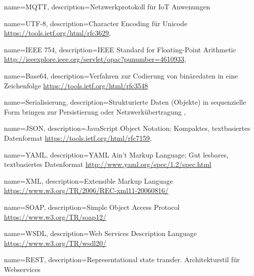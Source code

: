






{
    name=MQTT,
    description={Netzwerkprotokoll für IoT Anwenungen}
}


{
    name=UTF-8,
    description={Character Encoding für Unicode \url{https://tools.ietf.org/html/rfc3629}}, 
}

{
    name=IEEE 754,
    description={IEEE Standard for Floating-Point Arithmetic   \url{http://ieeexplore.ieee.org/servlet/opac?punumber=4610933}}, 
}


{
    name=Base64,
    description={Verfahren zur Codierung von binäredaten in eine Zeichenfolge
     \url{https://tools.ietf.org/html/rfc3548}}
}

{
    name=Serialisierung,
    description={Strukturierte Daten (Objekte) in sequenzielle Form bringen zur Persistierung oder Netzwerkübertragung }, 
}

{
    name=JSON,
    description={JavaScript Object Notation; Kompaktes, textbasiertes Datenformat
    \url{https://tools.ietf.org/html/rfc7159}}, 
}

{
    name=YAML,
    description={YAML Ain't Markup Language; Gut lesbares, textbasiertes Datenformat
    \url{http://www.yaml.org/spec/1.2/spec.html}}
}

{
    name=XML,
    description={Extensible Markup Language \url{https://www.w3.org/TR/2006/REC-xml11-20060816/}}
}

{
    name=SOAP,
    description={Simple Object Access Protocol \url{https://www.w3.org/TR/soap12/}}
}

{
    name=WSDL,
    description={Web Services Description Language \url{https://www.w3.org/TR/wsdl20/}}
}

{
    name=REST,
    description={Representational state transfer. Architekturstil für Webservices}
}